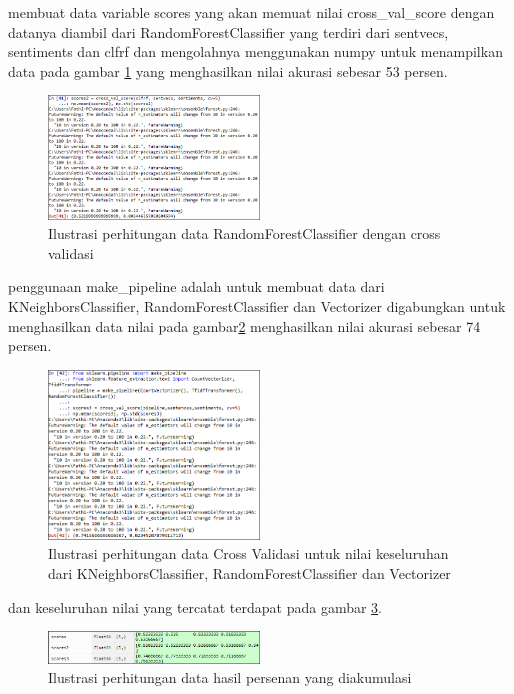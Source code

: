 \begin{enumerate}
\subitem membuat data variable scores yang akan memuat nilai cross\_val\_score dengan datanya diambil dari RandomForestClassifier yang terdiri dari sentvecs, sentiments dan clfrf dan mengolahnya menggunakan numpy untuk menampilkan data pada gambar \ref{d39} yang menghasilkan nilai akurasi sebesar 53 persen. 
\begin{figure}[!htbp]
	\centering
	\includegraphics[width=0.5\textwidth]{figures/fathi/chapter5/hari4/5}
	\caption{Ilustrasi perhitungan data  RandomForestClassifier dengan cross validasi}
	\label{d39}
\end{figure}

\subitem penggunaan make\_pipeline adalah untuk membuat data dari KNeighborsClassifier, RandomForestClassifier dan Vectorizer digabungkan untuk menghasilkan data nilai pada gambar\ref{d40} menghasilkan nilai akurasi sebesar 74 persen. 
\begin{figure}[!htbp]
	\centering
	\includegraphics[width=0.5\textwidth]{figures/fathi/chapter5/hari4/6}
	\caption{Ilustrasi perhitungan data Cross Validasi untuk nilai keseluruhan dari KNeighborsClassifier, RandomForestClassifier dan Vectorizer}
	\label{d40}
\end{figure}

dan keseluruhan nilai yang tercatat terdapat pada gambar \ref{d41}.
\begin{figure}[!htbp]
	\centering
	\includegraphics[width=0.5\textwidth]{figures/fathi/chapter5/hari4/7}
	\caption{Ilustrasi perhitungan data hasil persenan yang diakumulasi}
	\label{d41}
\end{figure}

\end{enumerate}